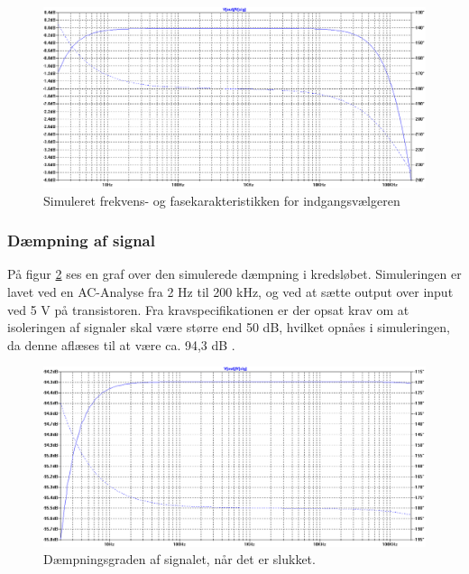 \begin{figure}[h]
\centering
\includegraphics[width=\textwidth]{teknisk/indgangsvaelger/simulering/frekvenskarakteristik.png}
\caption{Simuleret frekvens- og fasekarakteristikken for indgangsvælgeren}
\label{indgangsvaelger_frekvenskarakteristik}
\end{figure}

\subsubsection*{Dæmpning af signal}
På figur \ref{indgangsvaelger_daempniing} ses en graf over den simulerede dæmpning i kredsløbet. Simuleringen er lavet ved en AC-Analyse fra 2 Hz til 200 kHz, og ved at sætte output over input ved 5 V på transistoren. Fra kravspecifikationen er der opsat krav om at isoleringen af signaler skal være større end 50 dB, hvilket opnåes i simuleringen, da denne aflæses til at være ca. 94,3 dB .
\begin{figure}[h]
\centering
\includegraphics[width=\textwidth]{teknisk/indgangsvaelger/simulering/daempning_af_signal.png}
\caption{Dæmpningsgraden af signalet, når det er slukket.}
\label{indgangsvaelger_daempniing}
\end{figure}

